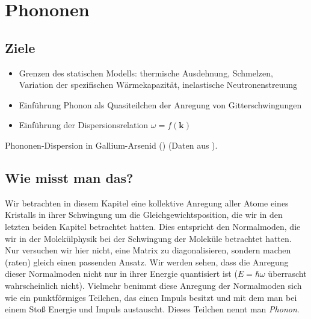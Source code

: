 
\chapter{Phononen}





\section{Ziele}

\begin{itemize}
\item Grenzen des statischen Modells: thermische Ausdehnung, Schmelzen, Variation der spezifischen Wärmekapazität, inelastische Neutronenstreuung

\item Einführung Phonon als Quasiteilchen der Anregung von Gitterschwingungen

\item Einführung der Dispersionsrelation $\omega = f(\mathbf{k})$
\end{itemize}




\begin{marginfigure}
\caption{Phononen-Dispersion in Gallium-Arsenid () (Daten aus \cite{Strauch_gaas}). \label{fig:phonon_intro}}

\end{marginfigure}


\section{Wie misst man das?}

Wir betrachten in diesem Kapitel eine kollektive Anregung aller Atome eines Kristalls in ihrer Schwingung um die Gleichgewichtsposition, die wir in den letzten beiden Kapitel betrachtet hatten. Dies entspricht den Normalmoden, die wir in der Molekülphysik bei der Schwingung der Moleküle betrachtet hatten. Nur versuchen wir hier nicht, eine Matrix zu diagonalisieren, sondern machen (raten) gleich einen passenden Ansatz. Wir werden sehen, dass die Anregung dieser Normalmoden nicht nur in ihrer Energie quantisiert ist ($E= \hbar \omega$ überrascht wahrscheinlich nicht). Vielmehr benimmt diese Anregung der  Normalmoden sich wie ein punktförmiges Teilchen, das einen Impuls besitzt und mit dem man bei einem Stoß Energie und Impuls austauscht. Dieses Teilchen nennt man \emph{Phonon}.

